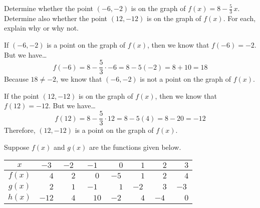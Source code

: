 \documentclass[11pt,letterpaper]{article}
\begin{document}

 Determine whether the point $(-6, -2)$ is on the graph of $f(x)= 8 - \frac{5}{3}\,x$. Determine also whether the point $(12, -12)$ is on the graph of $f(x)$. For each, explain why or why not. \pspace

\sol If $(-6, -2)$ is a point on the graph of $f(x)$, then we know that $f(-6)= -2$. But we have\dots
	\[
	f(-6)= 8 - \frac{5}{3} \cdot -6= 8 - 5(-2)= 8 + 10= 18
	\]
Because $18 \neq -2$, we know that $(-6, -2)$ is not a point on the graph of $f(x)$. \pspace

If the point $(12, -12)$ is on the graph of $f(x)$, then we know that $f(12)= -12$. But we have\dots
	\[
	f(12)= 8 - \frac{5}{3} \cdot 12= 8 - 5(4)= 8 - 20= -12
	\]
Therefore, $(12, -12)$ is a point on the graph of $f(x)$. 



\newpage



 Suppose $f(x)$ and $g(x)$ are the functions given below. 
        \begin{table}[!ht]
        \centering
        \begin{tabular}{| c || c | c | c | c | c | c | c |} \hline
	$x$ & $-3$ & $-2$ & $-1$ & $\phantom{-}0$ & $\phantom{-}1$ & $\phantom{-}2$ & $\phantom{-}3$ \\ \hline
	$f(x)$ & $\phantom{-1}4$ & $\phantom{-}2$ & $\phantom{-}0$ & $-5$ & $\phantom{-}1$ & $\phantom{-}2$ & $\phantom{-}4$ \\ \hline
	$g(x)$ & $\phantom{-1}2$ & $\phantom{-}1$ & $-1$ & $\phantom{-}1$ & $-2$ & $\phantom{-}3$ & $-3$ \\ \hline
	$h(x)$ & $-12$ & $\phantom{-}4$ & $\phantom{-}10$ & $-2$ & $\phantom{-}4$ & $-4$ & $\phantom{-}0$ \\ \hline
        \end{tabular}
        \end{table}
\end{document}

